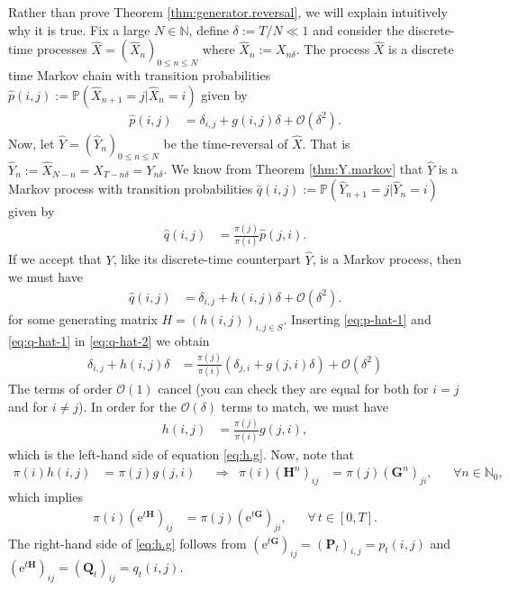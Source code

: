 \documentclass[12pt]{book}
\numberwithin{equation}{chapter}
\theoremstyle{plain}
\numberwithin{theorem}{section}
\theoremstyle{definition}
\numberwithin{exercise}{chapter}
\newcommand{\<}{\langle}
\renewcommand{\>}{\rangle}
\renewcommand{\(}{\left(}
\renewcommand{\)}{\right)}
\renewcommand{\[}{\left[}
\renewcommand{\]}{\right]}
\newcommand\Pb{\mathds{P}}
\newcommand\Nb{\mathds{N}}
\newcommand\Oc{\mathscr{O}}
\newcommand\del{\delta}
\newcommand\Gv{\pmb{G}}
\newcommand\Pv{\pmb{P}}
\newcommand\Qv{\pmb{Q}}
\newcommand\Hv{\pmb{H}}
\newcommand\Xh{\widehat{X}}
\newcommand\Yh{\widehat{Y}}
\newcommand\ph{\widehat{p}}
\newcommand\qh{\widehat{q}}
\newcommand\ee{\mathrm{e}}
\begin{document}
\noindent
Rather than prove Theorem \ref{thm:generator.reversal}, we will explain intuitively why it is true.  Fix a large $N \in \Nb$, define $\del := T/N \ll 1$ and consider the discrete-time processes $\Xh = (\Xh_n)_{0 \leq n \leq N}$ where $\Xh_n := X_{n \del}$.  The process $\Xh$ is a discrete time Markov chain with transition probabilities  $\ph(i,j) := \Pb( \Xh_{n+1} = j | \Xh_n = i)$ given by
\begin{align}
\ph(i,j)
	&=	\del_{i,j} + g(i,j) \del + \Oc(\del^2 ) . \label{eq:p-hat-1}
\end{align}
Now, let $\Yh = (\Yh_n)_{0 \leq n \leq N}$ be the time-reversal of $\Xh$.  That is $\Yh_n := \Xh_{N-n} = X_{T - n \del} = Y_{n \del}$.  We know from Theorem \ref{thm:Y.markov} that $\Yh$ is a Markov process with transition probabilities $\qh(i,j) := \Pb( \Yh_{n+1} = j | \Yh_n = i)$ given by
\begin{align}
\qh(i,j)
	&=	\frac{\pi(j)}{\pi(i)} \ph(j,i) . \label{eq:q-hat-2}
\end{align}
If we accept that $Y$, like its discrete-time counterpart $\Yh$, is a Markov process, then we must have
\begin{align}
\qh(i,j)
	&=	\del_{i,j} + h(i,j) \del  + \Oc(\del^2 ) . \label{eq:q-hat-1}
\end{align}
for some generating matrix $H = (h(i,j))_{i,j \in S}$.  Inserting \eqref{eq:p-hat-1} and \eqref{eq:q-hat-1} in \eqref{eq:q-hat-2} we obtain
\begin{align}
\del_{i,j} + h(i,j) \del 
	&=	\frac{\pi(j)}{\pi(i)} (\del_{j,i} + g(j,i) \del ) + \Oc(\del^2 ) 
\end{align}
The terms of order $\Oc( 1 )$ cancel (you can check they are equal for both for $i = j$ and for $i \neq j$).  In order for the $\Oc(\del)$ terms to match, we must have
\begin{align}
h(i,j)
	&=	\frac{\pi(j)}{\pi(i)} g(j,i) , 
\end{align}
which is the left-hand side of equation \eqref{eq:h.g}.  Now, note that
\begin{align}
\pi(i)h(i,j) 
	&= \pi(j)g(j,i) &
	&\Rightarrow &
\pi(i) (\Hv^n)_{ij} 
	&= \pi(j) (\Gv^n)_{ji} , &
	& \forall n \in \Nb_0 ,
\end{align}
which implies
\begin{align}
\pi(i) (\ee^{t \Hv}  )_{ij} 
	&= \pi(j) (\ee^{t \Gv}  )_{ji},  &
	&\forall \, t \in [0 ,T] .
\end{align}
The right-hand side of \eqref{eq:h.g} follows from $(\ee^{t \Gv}  )_{ij} = ( \Pv_t)_{i,j} = p_t(i,j)$ and $(\ee^{t \Hv}  )_{ij} = ( \Qv_t)_{ij} = q_t(i,j)$.
\end{document}
